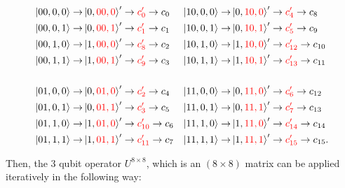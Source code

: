 \begin{align*}
\ket{00,0,0} \rightarrow & \ket{0,\color{red}00,0\color{black}}' \rightarrow \color{red}c'_{0}\color{black}\rightarrow c_{0} &
\ket{10,0,0} \rightarrow & \ket{0,\color{red}10,0\color{black}}' \rightarrow \color{red}c'_{4}\color{black}\rightarrow c_{8} \\
\ket{00,0,1} \rightarrow & \ket{0,\color{red}00,1\color{black}}' \rightarrow \color{red}c'_{1}\color{black}\rightarrow c_{1} &
\ket{10,0,1} \rightarrow & \ket{0,\color{red}10,1\color{black}}' \rightarrow \color{red}c'_{5}\color{black}\rightarrow c_{9} \\
\ket{00,1,0} \rightarrow & \ket{1,\color{red}00,0\color{black}}' \rightarrow \color{red}c'_{8}\color{black}\rightarrow c_{2} &
\ket{10,1,0} \rightarrow & \ket{1,\color{red}10,0\color{black}}' \rightarrow \color{red}c'_{12}\color{black}\rightarrow c_{10} \\
\ket{00,1,1} \rightarrow & \ket{1,\color{red}00,1\color{black}}' \rightarrow \color{red}c'_{9}\color{black}\rightarrow c_{3} &
\ket{10,1,1} \rightarrow & \ket{1,\color{red}10,1\color{black}}' \rightarrow \color{red}c'_{13}\color{black}\rightarrow c_{11} \\
\\
\ket{01,0,0} \rightarrow & \ket{0,\color{red}01,0\color{black}}' \rightarrow \color{red}c'_{2}\color{black}\rightarrow c_{4} &
\ket{11,0,0} \rightarrow & \ket{0,\color{red}11,0\color{black}}' \rightarrow \color{red}c'_{6}\color{black}\rightarrow c_{12} \\
\ket{01,0,1} \rightarrow & \ket{0,\color{red}01,1\color{black}}' \rightarrow \color{red}c'_{3}\color{black}\rightarrow c_{5} &
\ket{11,0,1} \rightarrow & \ket{0,\color{red}11,1\color{black}}' \rightarrow \color{red}c'_{7}\color{black}\rightarrow c_{13} \\
\ket{01,1,0} \rightarrow & \ket{1,\color{red}01,0\color{black}}' \rightarrow \color{red}c'_{10}\color{black}\rightarrow c_{6} &
\ket{11,1,0} \rightarrow & \ket{1,\color{red}11,0\color{black}}' \rightarrow \color{red}c'_{14}\color{black}\rightarrow c_{14} \\
\ket{01,1,1} \rightarrow & \ket{1,\color{red}01,1\color{black}}' \rightarrow \color{red}c'_{11}\color{black}\rightarrow c_{7} &
\ket{11,1,1} \rightarrow & \ket{1,\color{red}11,1\color{black}}' \rightarrow \color{red}c'_{15}\color{black}\rightarrow c_{15}. \\
\end{align*}

Then, the 3 qubit operator $U^{8\times{}8}$, which is an $(8\times8)$ matrix can be applied iteratively in the following way:

